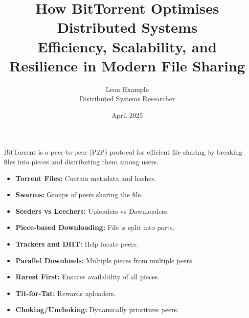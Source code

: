 \documentclass[a0paper,landscape]{a0poster}
\title{\Huge\textbf{How BitTorrent Optimises Distributed Systems}\\[0.5em]
\Large Efficiency, Scalability, and Resilience in Modern File Sharing}
\author{\Large Leon Example \\ \normalsize Distributed Systems Researcher}
\date{April 2025}
\begin{document}

\begin{multicols}{3} %

BitTorrent is a peer-to-peer (P2P) protocol for efficient file sharing by breaking files into pieces and distributing them among users.


\begin{itemize}[leftmargin=*]
  \item \textbf{Torrent Files:} Contain metadata and hashes.
  \item \textbf{Swarms:} Groups of peers sharing the file.
  \item \textbf{Seeders vs Leechers:} Uploaders vs Downloaders.
  \item \textbf{Piece-based Downloading:} File is split into parts.
  \item \textbf{Trackers and DHT:} Help locate peers.
\end{itemize}


\begin{itemize}[leftmargin=*]
  \item \textbf{Parallel Downloads:} Multiple pieces from multiple peers.
  \item \textbf{Rarest First:} Ensures availability of all pieces.
  \item \textbf{Tit-for-Tat:} Rewards uploaders.
  \item \textbf{Choking/Unchoking:} Dynamically prioritizes peers.
\end{itemize}



\end{multicols}
\end{document}
